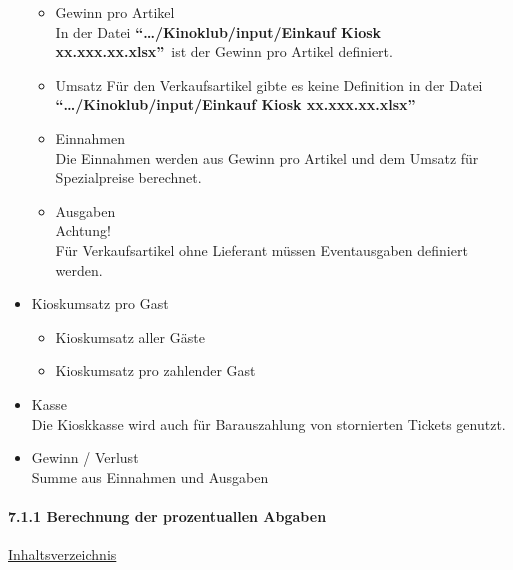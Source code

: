 \documentclass[
]{article}
\providecommand{\tightlist}{%
  \setlength{\itemsep}{0pt}\setlength{\parskip}{0pt}}
\begin{document}
\begin{itemize}
  \begin{itemize}
  \tightlist
  \item
    Gewinn pro Artikel\\
    In der Datei \textbf{``\ldots/Kinoklub/input/Einkauf Kiosk
    xx.xxx.xx.xlsx''}~ist der Gewinn pro Artikel definiert.
  \item
    Umsatz Für den Verkaufsartikel gibte es keine Definition in der
    Datei \textbf{``\ldots/Kinoklub/input/Einkauf Kiosk
    xx.xxx.xx.xlsx''}\\
  \item
    Einnahmen\\
    Die Einnahmen werden aus Gewinn pro Artikel und dem Umsatz für
    Spezialpreise berechnet.
  \item
    Ausgaben\\
    Achtung!\\
    Für Verkaufsartikel ohne Lieferant müssen Eventausgaben definiert
    werden.
  \end{itemize}
\item
  Kioskumsatz pro Gast

  \begin{itemize}
  \tightlist
  \item
    Kioskumsatz aller Gäste
  \item
    Kioskumsatz pro zahlender Gast
  \end{itemize}
\item
  Kasse\\
  Die Kioskkasse wird auch für Barauszahlung von stornierten Tickets
  genutzt.
\item
  Gewinn / Verlust\\
  Summe aus Einnahmen und Ausgaben
\end{itemize}

\paragraph{7.1.1 Berechnung der prozentuallen
Abgaben}\label{berechnung-der-prozentuallen-abgaben}

\hyperref[Inhaltsverzeichnis]{Inhaltsverzeichnis}
\end{document}
